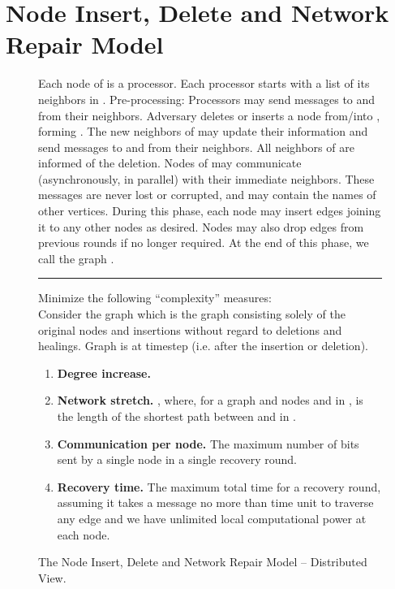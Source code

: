 \documentclass[11pt, letter]{article}
\begin{document}
\section{Node Insert, Delete and Network Repair Model}
\label{sec:prelim}
 



\begin{figure}[h!]
\caption{The Node Insert, Delete and Network Repair Model -- Distributed View.}
\label{algo:model-2}
\begin{boxedminipage}{\textwidth}
\begin{algorithmic}
\STATE Each node of  is a processor.  
\STATE Each processor starts with a list of its neighbors in .
\STATE Pre-processing: Processors may send messages to and from
their neighbors.
\STATE Adversary deletes or inserts a node  from/into , forming .
\STATE The new neighbors of  may update their information and send messages to and from
their neighbors.
\ENDIF
{} 
\STATE All neighbors of  are informed of the deletion.
\STATE Nodes of  may communicate (asynchronously, in parallel) 
with their immediate neighbors.  These messages are never lost or
corrupted, and may contain the names of other vertices.
\STATE During this phase, each node may insert edges
joining it to any other nodes as desired. 
Nodes may also drop edges from previous rounds if no longer required.
\ENDIF
\STATE At the end of this phase, we call the graph .
\ENDFOR
\vspace{10pt}
\hrule
\STATE
{} Minimize the following ``complexity'' measures:\\
Consider the graph   which is the graph consisting solely of the original nodes and insertions without regard to
deletions and healings. Graph  is  at timestep  (i.e. after the  insertion or deletion).
\begin{enumerate}
\item{\bf Degree increase.}  
\item {\bf Network stretch.} , where, for a graph  and nodes  and  in ,  is the
length of the shortest path between  and  in .
\item{\bf Communication per node.} The maximum number of bits sent by a single node in a single recovery round.
\item{\bf Recovery time.} The maximum total time for a recovery round,
assuming it takes a message no more than  time unit to traverse any edge and we have unlimited local computational power at each node.
\end{enumerate}
\end{algorithmic}
\end{boxedminipage}
\end{figure}
\end{document}
